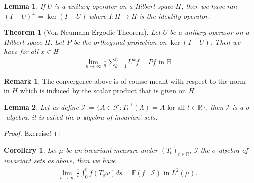 \documentclass[11pt,a4paper, final]{article}
\newtheorem{lem}{Lemma}[section]
\newtheorem{thm}{Theorem}[section]
\newtheorem{cor}{Corollary}[section]
\theoremstyle{definition}
\newtheorem{rem}{Remark}[section]
\begin{document}
\begin{lem} If $U$ is a unitary operator on a Hilbert space $H$, then we have ran$(I-U)^\perp = \ker(I-U)$ where $I: H \to H$ is the identity operator. 
\end{lem}
\begin{thm}[Von Neumann Ergodic Theorem] Let $U$ be a unitary operator on a Hilbert space $H$. Let $P$ be the orthogonal projection on $\ker(I-U)$. Then we have for all $x \in H$ 
\begin{align*}
\lim_{n \to \infty} \frac{1}{n} \sum_{k=1}^n U^k f = Pf \text{ in H}
\end{align*}
\end{thm}
\begin{rem} The convergence above is of course meant with respect to the norm in $H$ which is induced by the scalar product that is given on $H$. 
\end{rem}
\begin{lem} Let us define $\mathcal{I}:= \lbrace A \in \mathcal{F} : T_t^{-1}(A) = A \text{ for all } t \in \mathbb{R} \rbrace$, then $\mathcal{I}$ is a $\sigma$-algebra, it is called the $\sigma$-algebra of invariant sets. 
\end{lem}
\begin{proof}
Exercise!
\end{proof}
\begin{cor} Let $\mu$ be an invariant measure under $(T_t)_{t \in \mathbb{R}}$, $\mathcal{I}$ the $\sigma$-algebra of invariant sets as above, then we have 
\begin{align*}
\lim_{t \to \infty} \frac{1}{t} \int_0^t f (T_s \omega) ds = \mathbb{E}(f \mid \mathcal{I}) \text{ in } L^2( \mu).
\end{align*}
\end{cor}
\newpage
\end{document}
